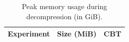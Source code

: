 \begin{table}[t]
\caption{Peak memory usage during decompression (in GiB). }
\label{t:memory-decompression}
\centering
\setlength{\tabcolsep}{5pt}
\begin{tabular}{|l|c|c|}
\hline
Experiment & Size (MiB) & CBT \\
\hline
\hline
\end{tabular}
\end{table}